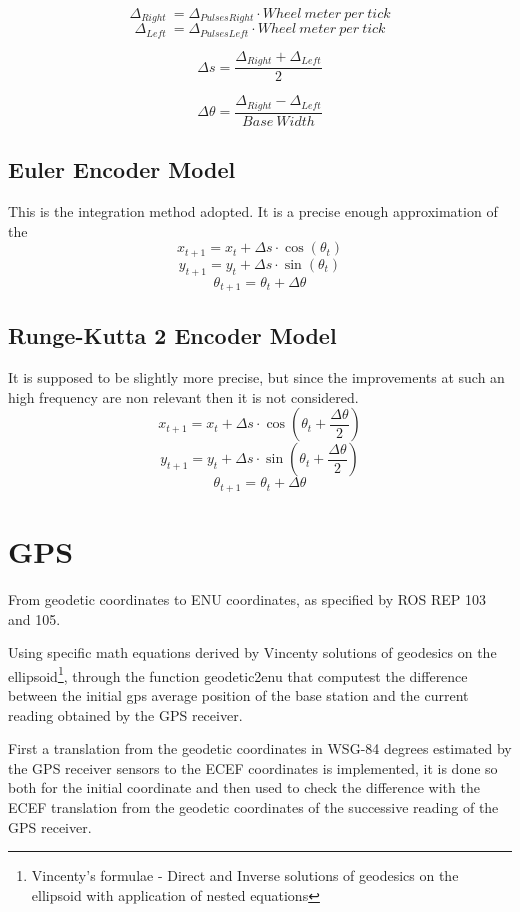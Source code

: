 {$$
\Delta _{Right} ~ = \Delta _{PulsesRight} \cdot Wheel~meter~per~tick
$$
$$
\Delta _{Left} ~ = \Delta _{PulsesLeft} \cdot Wheel~meter~per~tick
$$

$$
\Delta s = \frac{\Delta _{Right} + \Delta _{Left}}{2}
$$


$$
\Delta {\theta} = \frac{\Delta _{Right} - \Delta _{Left}}{Base~Width}
$$

\subsection{Euler Encoder Model}

\noindent This is the integration method adopted. It is a precise enough approximation of the
$$
x_{t+1} = x_t + \Delta s \cdot \cos(\theta_t)
$$
$$
y_{t+1} = y_t + \Delta s \cdot \sin(\theta_t)
$$
$$
\theta_{t+1} = \theta_t + \Delta {\theta}
$$

\subsection{Runge-Kutta 2 Encoder Model}

\noindent It is supposed to be slightly more precise, but since the improvements at such an high frequency are non relevant then it is not considered.
$$
x_{t+1} = x_t + \Delta s \cdot \cos(\theta_t + \frac{\Delta{\theta}}{2} )
$$
$$
y_{t+1} = y_t + \Delta s \cdot \sin(\theta_t + \frac{\Delta{\theta}}{2} )
$$
$$
\theta_{t+1} = \theta_t + \Delta {\theta}
$$





\section{GPS}
\noindent
From geodetic coordinates to ENU coordinates, as specified by ROS REP 103 and 105.

Using  specific math equations derived by Vincenty solutions of geodesics on the ellipsoid\footnote{Vincenty's formulae  -  Direct and Inverse solutions of geodesics on the ellipsoid with application of nested equations}, through the function geodetic2enu that computest the difference between the initial gps average position of the base station and the current reading obtained by the GPS receiver.

First a translation from the geodetic coordinates in WSG-84 degrees estimated by the GPS receiver sensors to the ECEF coordinates is implemented, it is done so both for the initial coordinate and then used to check the difference with the ECEF translation from the geodetic coordinates of the successive reading of the GPS receiver.


}
